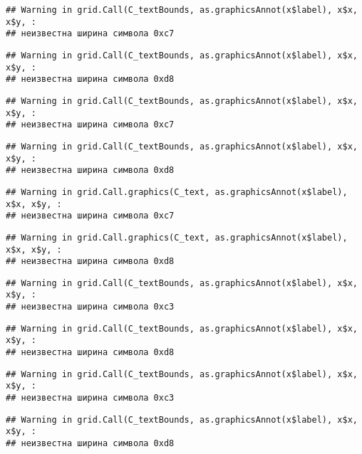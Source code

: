 \documentclass[
]{article}
\begin{document}
\begin{verbatim}
## Warning in grid.Call(C_textBounds, as.graphicsAnnot(x$label), x$x, x$y, :
## неизвестна ширина символа 0xc7
\end{verbatim}

\begin{verbatim}
## Warning in grid.Call(C_textBounds, as.graphicsAnnot(x$label), x$x, x$y, :
## неизвестна ширина символа 0xd8
\end{verbatim}

\begin{verbatim}
## Warning in grid.Call(C_textBounds, as.graphicsAnnot(x$label), x$x, x$y, :
## неизвестна ширина символа 0xc7
\end{verbatim}

\begin{verbatim}
## Warning in grid.Call(C_textBounds, as.graphicsAnnot(x$label), x$x, x$y, :
## неизвестна ширина символа 0xd8
\end{verbatim}

\begin{verbatim}
## Warning in grid.Call.graphics(C_text, as.graphicsAnnot(x$label), x$x, x$y, :
## неизвестна ширина символа 0xc7
\end{verbatim}

\begin{verbatim}
## Warning in grid.Call.graphics(C_text, as.graphicsAnnot(x$label), x$x, x$y, :
## неизвестна ширина символа 0xd8
\end{verbatim}

\begin{verbatim}
## Warning in grid.Call(C_textBounds, as.graphicsAnnot(x$label), x$x, x$y, :
## неизвестна ширина символа 0xc3
\end{verbatim}

\begin{verbatim}
## Warning in grid.Call(C_textBounds, as.graphicsAnnot(x$label), x$x, x$y, :
## неизвестна ширина символа 0xd8
\end{verbatim}

\begin{verbatim}
## Warning in grid.Call(C_textBounds, as.graphicsAnnot(x$label), x$x, x$y, :
## неизвестна ширина символа 0xc3
\end{verbatim}

\begin{verbatim}
## Warning in grid.Call(C_textBounds, as.graphicsAnnot(x$label), x$x, x$y, :
## неизвестна ширина символа 0xd8
\end{verbatim}
\end{document}
